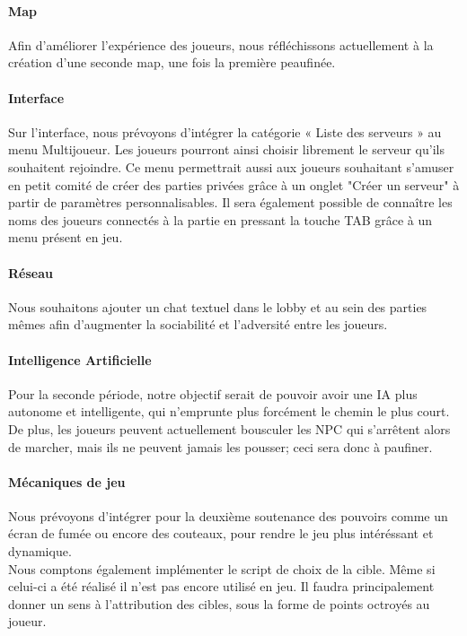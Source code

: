         \paragraph{Map}
        Afin d'améliorer l'expérience des joueurs, nous réfléchissons actuellement à la création d'une 
        seconde map, une fois la première peaufinée.

        \paragraph{Interface}
        Sur l’interface, nous prévoyons d’intégrer la catégorie « Liste des serveurs » au menu Multijoueur. 
        Les joueurs pourront ainsi choisir librement le serveur qu’ils souhaitent rejoindre. 
        Ce menu permettrait aussi aux joueurs souhaitant s'amuser en petit comité de créer des 
        parties privées grâce à un onglet "Créer un serveur" à partir de paramètres personnalisables. 
        Il sera également possible de connaître les noms des joueurs connectés à la partie en pressant 
        la touche TAB grâce à un menu présent en jeu.

        \paragraph{Réseau}
        Nous souhaitons ajouter un chat textuel dans le lobby et au sein des parties mêmes afin d’augmenter la sociabilité et l’adversité entre les joueurs.

        \paragraph{Intelligence Artificielle}
        Pour la seconde période, notre objectif serait de pouvoir avoir une IA plus autonome et intelligente, qui n'emprunte plus forcément le chemin le plus court. 
        De plus, les joueurs peuvent actuellement bousculer les NPC qui s'arrêtent alors de marcher, mais ils ne peuvent jamais les pousser; 
        ceci sera donc à paufiner.

        \paragraph{Mécaniques de jeu}
        Nous prévoyons d'intégrer pour la deuxième soutenance des pouvoirs
        comme un écran de fumée ou encore des couteaux,
        pour rendre le jeu plus intéréssant et dynamique.\\
        Nous comptons également implémenter le script de choix de la cible.
        Même si celui-ci a été réalisé il n'est pas encore utilisé en jeu.
        Il faudra principalement donner un sens à l'attribution des cibles,
        sous la forme de points octroyés au joueur.

